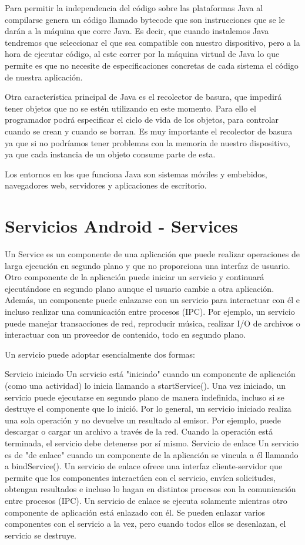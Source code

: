 Para permitir la independencia del código sobre las plataformas Java al compilarse genera un código llamado bytecode que son instrucciones que se le darán a la máquina que corre Java. Es decir, que cuando instalemos Java tendremos que seleccionar el que sea compatible con nuestro dispositivo, pero a la hora de ejecutar código, al este correr por la máquina virtual de Java lo que permite es que no necesite de especificaciones concretas de cada sistema el código de nuestra aplicación.

Otra característica principal de Java es el recolector de basura, que impedirá tener objetos que no se estén utilizando en este momento. Para ello el programador podrá especificar el ciclo de vida de los objetos, para controlar cuando se crean y cuando se borran. Es muy importante el recolector de basura ya que si no podríamos tener problemas con la memoria de nuestro dispositivo, ya que cada instancia de un objeto consume parte de esta.

Los entornos en los que funciona Java son sistemas móviles y embebidos, navegadores web, servidores y aplicaciones de escritorio.\cite{Java}

\section{Servicios Android - Services}
Un Service es un componente de una aplicación que puede realizar operaciones de larga ejecución en segundo plano y que no proporciona una interfaz de usuario. Otro componente de la aplicación puede iniciar un servicio y continuará ejecutándose en segundo plano aunque el usuario cambie a otra aplicación. Además, un componente puede enlazarse con un servicio para interactuar con él e incluso realizar una comunicación entre procesos (IPC). Por ejemplo, un servicio puede manejar transacciones de red, reproducir música, realizar I/O de archivos o interactuar con un proveedor de contenido, todo en segundo plano.

Un servicio puede adoptar esencialmente dos formas:

Servicio iniciado
Un servicio está "iniciado" cuando un componente de aplicación (como una actividad) lo inicia llamando a startService(). Una vez iniciado, un servicio puede ejecutarse en segundo plano de manera indefinida, incluso si se destruye el componente que lo inició. Por lo general, un servicio iniciado realiza una sola operación y no devuelve un resultado al emisor. Por ejemplo, puede descargar o cargar un archivo a través de la red. Cuando la operación está terminada, el servicio debe detenerse por sí mismo.
Servicio de enlace
Un servicio es de "de enlace" cuando un componente de la aplicación se vincula a él llamando a bindService(). Un servicio de enlace ofrece una interfaz cliente-servidor que permite que los componentes interactúen con el servicio, envíen solicitudes, obtengan resultados e incluso lo hagan en distintos procesos con la comunicación entre procesos (IPC). Un servicio de enlace se ejecuta solamente mientras otro componente de aplicación está enlazado con él. Se pueden enlazar varios componentes con el servicio a la vez, pero cuando todos ellos se desenlazan, el servicio se destruye.

